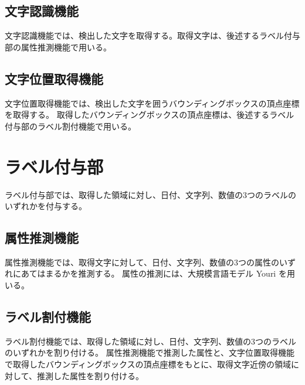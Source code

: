 \subsection{文字認識機能}\label{subsec:char_recognition}
文字認識機能では、検出した文字を取得する。取得文字は、後述するラベル付与部の属性推測機能で用いる。

\subsection{文字位置取得機能}\label{subsec:char_position_obtainment}
文字位置取得機能では、検出した文字を囲うバウンディングボックスの頂点座標を取得する。
取得したバウンディングボックスの頂点座標は、後述するラベル付与部のラベル割付機能で用いる。


\section{ラベル付与部}\label{sec:label_link_part}
ラベル付与部では、取得した領域に対し、日付、文字列、数値の3つのラベルのいずれかを付与する。


\subsection{属性推測機能}\label{subsec:att_prediction}
属性推測機能では、取得文字に対して、日付、文字列、数値の3つの属性のいずれにあてはまるかを推測する。
属性の推測には、大規模言語モデル Youri を用いる。

\subsection{ラベル割付機能}\label{subsec:label_link}
ラベル割付機能では、取得した領域に対し、日付、文字列、数値の3つのラベルのいずれかを割り付ける。
属性推測機能で推測した属性と、文字位置取得機能で取得したバウンディングボックスの頂点座標をもとに、取得文字近傍の領域に対して、推測した属性を割り付ける。
